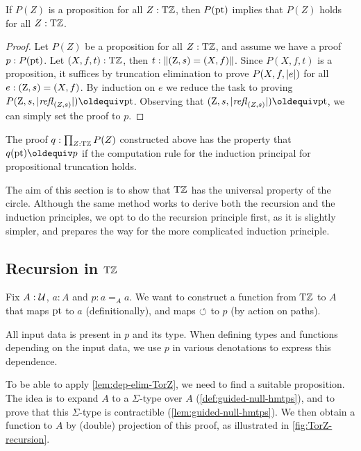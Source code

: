 \documentclass[a4,12pt]{amsart}
\begin{document}
\begin{lemma}\label{lem:dep-elim-TorZ}
If $P(Z)$ is a proposition for all $Z:{\mathrm{T}\mathbb{Z}}$, then $P({\mathord{\mathrm{pt}}})$ implies that $P(Z)$ holds for all $Z:{\mathrm{T}\mathbb{Z}}$.
\end{lemma}

\begin{proof}
Let $P(Z)$ be a proposition for all $Z:{\mathrm{T}\mathbb{Z}}$, and assume we have a proof
$p:P({\mathord{\mathrm{pt}}})$. Let $(X,f,t):{\mathrm{T}\mathbb{Z}}$, then $t :\lVert(\mathrm{Z},s)=(X,f)\rVert$.
Since $P(X,f,t)$ is a proposition, it suffices by truncation elimination
to prove $P(X,f,\lvert e\rvert)$ for all $e:(\mathrm{Z},s)=(X,f)$. 
By induction on $e$ we reduce the task to proving $P(\zet,s,\trunc{\refl{(Z,s)}}) \jdeq \pt$.
Observing that $(\zet,s,\trunc{\refl{(Z,s)}})\jdeq\pt$, we can simply set the proof to $p$.
\end{proof}

The proof $q: \prod_{Z:{\mathrm{T}\mathbb{Z}}} P(Z)$ constructed above has the property that $q(\pt)\jdeq p$ if the computation rule for the induction principal
for propositional truncation holds.

The aim of this section is to show that ${\mathrm{T}\mathbb{Z}}$ has the
universal property of the circle.
Although the same method works to derive both the recursion and the induction principles,
we opt to do the recursion principle first, as it is slightly simpler,
and prepares the way for the more complicated induction principle.

\subsection{Recursion in ${\mathrm{T}\mathbb{Z}}$}\label{sec:TorZ-recursion}

Fix $A:\mathcal{U}$, $a:A$ and $p: a=_A a$.
We want to construct a function from ${\mathrm{T}\mathbb{Z}}$ to $A$ 
that maps ${\mathord{\mathrm{pt}}}$ to $a$ (definitionally),
and maps $\circlearrowleft$ to $p$ (by action on paths).

All input data is present in $p$ and its type.
When defining types and functions depending on the input data, 
we use $p$ in various denotations to express this dependence. 

To be able to apply \cref{lem:dep-elim-TorZ}, 
we need to find a suitable proposition.
The idea is to expand $A$ to a $\Sigma$-type over $A$
(\cref{def:guided-null-hmtps}), 
and to prove that this $\Sigma$-type is contractible
(\cref{lem:guided-null-hmtps}).
We then obtain a function to $A$ by (double) projection
of this proof, as illustrated in \cref{fig:TorZ-recursion}.
\end{document}
